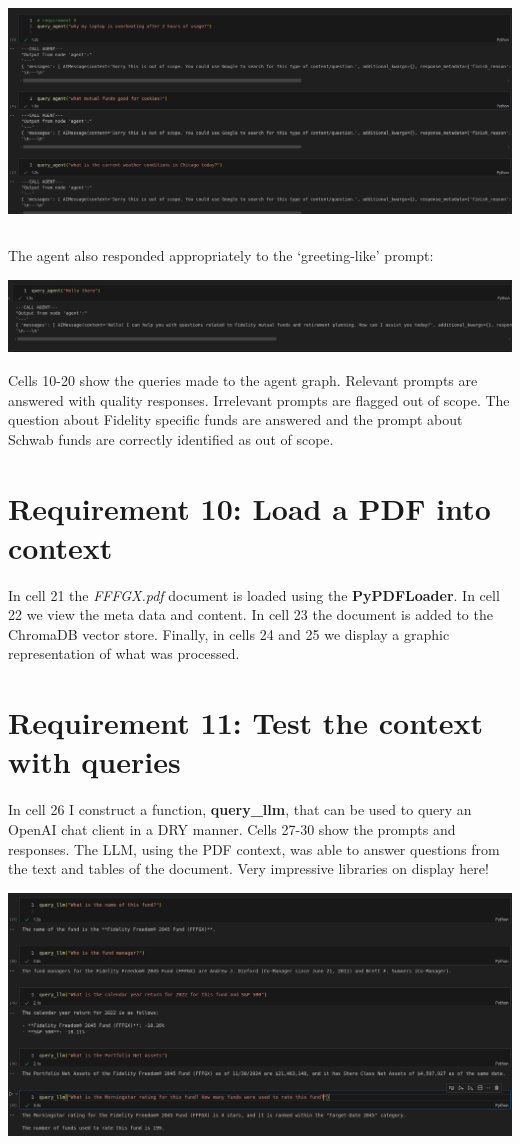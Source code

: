 \documentclass[11pt,letterpaper]{article}
\begin{document}
\begin{center}
    \includegraphics[height=175pt]{req_9.png}
\end{center}

The agent also responded appropriately to the `greeting-like' prompt:

\begin{center}
    \includegraphics{req_9B.png}
\end{center}

Cells 10-20 show the queries made to the agent graph. Relevant prompts are answered with quality responses.
Irrelevant prompts are flagged out of scope. The question about Fidelity specific funds are answered and the 
prompt about Schwab funds are correctly identified as out of scope.

\clearpage

\section*{Requirement 10: Load a PDF into context}
\tab In cell 21 the \textit{FFFGX.pdf} document is loaded using the \textbf{PyPDFLoader}. In cell 22 we view the meta data and content.
In cell 23 the document is added to the ChromaDB vector store. Finally, in cells 24 and 25 we display a graphic representation of what
was processed.

\section*{Requirement 11: Test the context with queries}
\tab In cell 26 I construct a function, \textbf{query\_llm}, that can be used to query an OpenAI chat client in a DRY manner.
Cells 27-30 show the prompts and responses. The LLM, using the PDF context, was able to answer questions from the text and tables
of the document. Very impressive libraries on display here!

\begin{center}
    \includegraphics{req_11.png}
\end{center}
\end{document}

